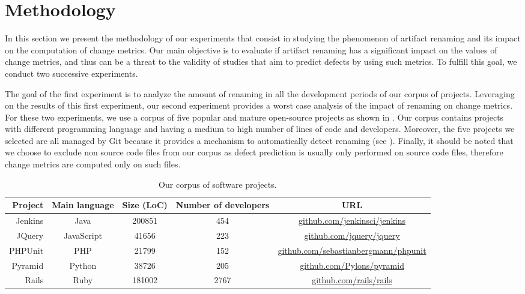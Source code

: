 \section{Methodology}
\label{sec:methodology}

In this section we present the methodology of our experiments that consist in studying the phenomenon of artifact renaming and its impact on the computation of change metrics. Our main objective is to evaluate if artifact renaming has a significant impact on the values of change metrics, and thus can be a threat to the validity of studies that aim to predict defects by using such metrics. To fulfill this goal, we conduct two successive experiments.

The goal of the first experiment is to analyze the amount of renaming in all the development periods of our corpus of projects. Leveraging on the results of this first experiment, our second experiment provides a worst case analysis of the impact of renaming on change metrics. For these two experiments, we use a corpus of five popular and mature open-source projects as shown in . Our corpus contains projects with different programming language and having a medium to high number of lines of code and developers. Moreover, the five projects we selected are all managed by Git because it provides a mechanism to automatically detect renaming (see ). Finally, it should be noted that we choose to exclude non source code files from our corpus as defect prediction is usually only performed on source code files, therefore change metrics are computed only on such files.

\begin{table*}[t]
\centering
\begin{tabular}{rcccc}
\toprule
Project & Main language & Size (LoC) & Number of developers & URL\\
\midrule
Jenkins & Java & 200851 & 454 & \url{github.com/jenkinsci/jenkins} \\
JQuery & JavaScript & 41656 & 223 & \url{github.com/jquery/jquery} \\
PHPUnit & PHP & 21799 & 152 & \url{github.com/sebastianbergmann/phpunit}\\
Pyramid & Python & 38726 & 205 & \url{github.com/Pylons/pyramid} \\
Rails & Ruby & 181002 & 2767 & \url{github.com/rails/rails}\\
\bottomrule
\end{tabular}
\caption{Our corpus of software projects.}
\label{tab:projects}
\end{table*}

